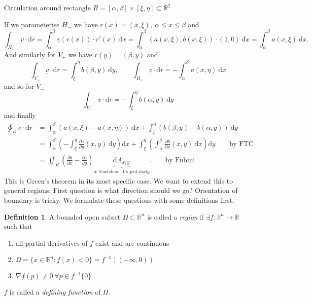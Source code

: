 \documentclass[a4paper]{article}
\theoremstyle{definition}
\newtheorem{defn}{Definition}[subsection]
\begin{document}
Circulation around rectangle $R=[\alpha,\beta]\times [\xi,\eta] \subset \mathbb R^2$

\begin{center}
\end{center}

If we parameterise $H_{-}$ we have $r(x) = (x,\xi),\ \alpha \leq x\leq \beta$ and
\[
\int_{H_-} \underline v \cdot \mathrm d r = \int_\alpha^\beta \underline v (r(x)) \cdot r'(x) \ \mathrm d x = \int_\alpha^\beta (a(x,\xi),b(x,\xi)) \cdot (1,0) \ \mathrm d x = \int_\alpha^\beta a(x,\xi) \ \mathrm d x .
\]
And similarly for $V_+$ we have $r(y)=(\beta,y)$ and
\[
\int_{V_+} \underline v \cdot \mathrm d r = \int_\xi^\eta b(\beta, y) \ \mathrm d y ,\qquad \int_{H_+} \underline v \cdot \mathrm d r = -\int_\alpha^\beta a(x,\eta) \ \mathrm d x
\]
and so for $V_-$
\[
\int_{V_-} \underline v \cdot \mathrm d r = -\int_\xi^\eta b(\alpha ,y) \ \mathrm d y
\]
and finally
\[
\begin{aligned}
\ointctrclockwise _R \underline v \cdot \mathrm d r &= \int_\alpha^\beta (a(x,\xi)-a(x,\eta)) \ \mathrm d x + \int_\xi^\eta (b(\beta,y)-b(\alpha,y)) \ \mathrm d y \\ &= \int_\alpha^\beta \left( -\int_\xi^\eta \frac{\partial a}{\partial y} (x,y) \ \mathrm d y \right) \mathrm d x+\int_\xi^\eta \left( \int_\alpha^\beta \frac{\partial b}{\partial x} (x,y) \ \mathrm d x \right) \mathrm d y \qquad \text{by FTC} \\
&= \iint_R \left( \frac{\partial b}{\partial x}-\frac{\partial a}{\partial y} \right) \underbrace{\mathrm dA_{x,y}}_{\text{in Euclidean it's just }\mathrm d x \mathrm d y}. \qquad \text{by Fubini}
\end{aligned}
\]
This is Green's theorem in its most specific case. We want to extend this to general regions. First question is what direction should we go? Orientation of boundary is tricky. We formulate these questions with some definitions first.
\begin{defn}
A bounded open subset $\Omega \subset \mathbb R^n$ is called a \textit{region} if $\exists f:\mathbb R^n \rightarrow \mathbb R$ such that
\begin{enumerate}
    \item all partial derivatives of $f$ exist and are continuous
    \item $\Omega = \{x\in \mathbb R^n : f(x) <0\} = f^{-1} ((-\infty,0))$
    \item $\nabla f(p) \neq 0 \ \forall p\in f^{-1}\{0\}$
\end{enumerate}
$f$ is called a \textit{defining function} of $\Omega$.
\end{defn}
\end{document}

